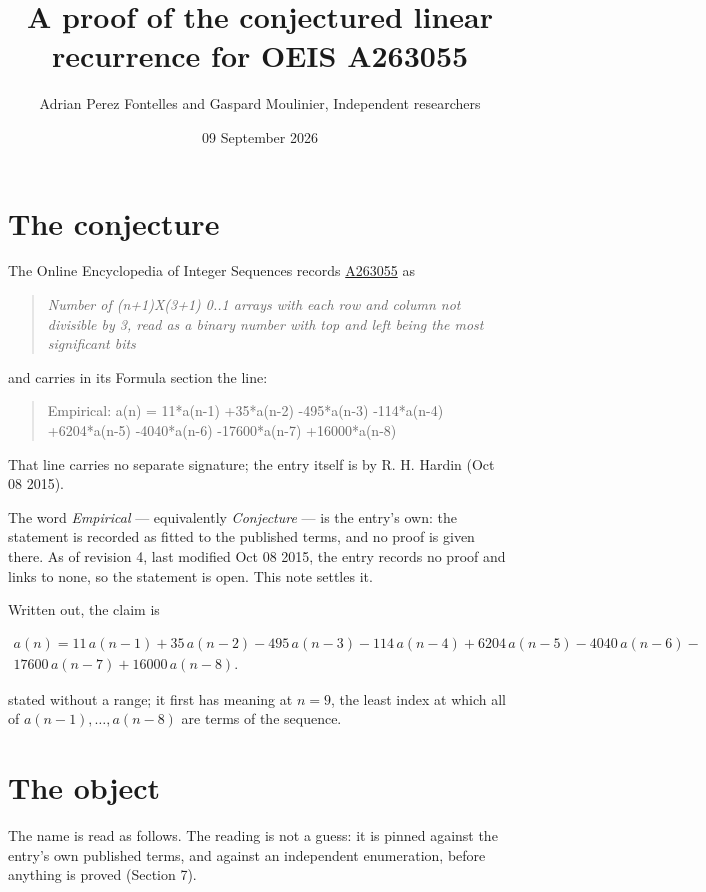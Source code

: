 \documentclass[11pt]{article}
\title{A proof of the conjectured linear recurrence for OEIS A263055}
\author{Adrian Perez Fontelles and Gaspard Moulinier, Independent researchers}
\date{09 September 2026}
\theoremstyle{definition}
\begin{document}
\maketitle
\section{The conjecture}

The Online Encyclopedia of Integer Sequences records \href{https://oeis.org/A263055}{A263055} as

\begin{quote}\itshape Number of (n+1)X(3+1) 0..1 arrays with each row and column not divisible by 3, read as a binary number with top and left being the most significant bits\end{quote}

and carries in its Formula section the line:

\begin{quote}\ttfamily Empirical: a(n) = 11*a(n-1) +35*a(n-2) -495*a(n-3) -114*a(n-4) +6204*a(n-5) -4040*a(n-6) -17600*a(n-7) +16000*a(n-8)\end{quote}

That line carries no separate signature; the entry itself is by R. H. Hardin (Oct 08 2015).

The word {\itshape Empirical} --- equivalently {\itshape Conjecture} --- is the entry's own: the statement is recorded as fitted to the published terms, and no proof is given there. As of revision 4, last modified Oct 08 2015, the entry records no proof and links to none, so the statement is open. This note settles it.

Written out, the claim is

\begin{multline*} a(n) = 11\,a(n-1) + 35\,a(n-2) - 495\,a(n-3) - 114\,a(n-4) + 6204\,a(n-5) - 4040\,a(n-6) - \\ 17600\,a(n-7) + 16000\,a(n-8). \end{multline*}

stated without a range; it first has meaning at $n = 9$, the least index at which all of $a(n-1),\dots,a(n-8)$ are terms of the sequence.

\section{The object}

The name is read as follows. The reading is not a guess: it is pinned against the entry's own published terms, and against an independent enumeration, before anything is proved (Section 7).
\end{document}
